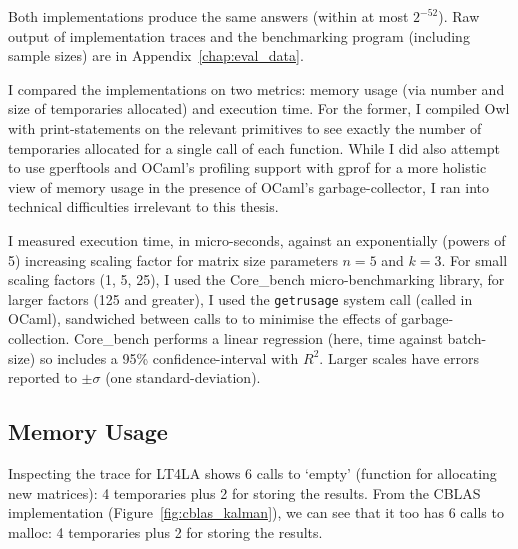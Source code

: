 Both implementations produce the same answers (within at most $2^{-52}$). Raw
output of implementation traces and the benchmarking program (including sample
sizes) are in Appendix~\ref{chap:eval_data}.

I compared the implementations on two metrics: memory usage (via number and
size of temporaries allocated) and execution time. For the former, I compiled
Owl with print-statements on the relevant primitives to see exactly the number
of temporaries allocated for a single call of each function. While I did also
attempt to use gperftools and OCaml's profiling support with gprof for a more
holistic view of memory usage in the presence of OCaml's garbage-collector, I
ran into technical difficulties irrelevant to this thesis.

I measured execution time, in micro-seconds, against an exponentially (powers
of 5) increasing scaling factor for matrix size parameters $n=5$ and $k=3$.
For small scaling factors (1, 5, 25), I used the Core\_bench micro-benchmarking
library, for larger factors (125 and greater), I used the \texttt{getrusage}
system call (called  in OCaml), sandwiched between calls to
 to minimise the effects of garbage-collection.
Core\_bench performs a linear regression (here, time against batch-size) so
includes a 95\% confidence-interval with $R^2$. Larger scales have
errors reported to $\pm \sigma$ (one standard-deviation).

\subsection{Memory Usage}

Inspecting the trace for LT4LA shows 6 calls to `empty' (function for
allocating new matrices): 4 temporaries plus 2 for storing the results. From
the CBLAS implementation (Figure~\ref{fig:cblas_kalman}), we can see that it
too has 6 calls to malloc: 4 temporaries plus 2 for storing the results.

